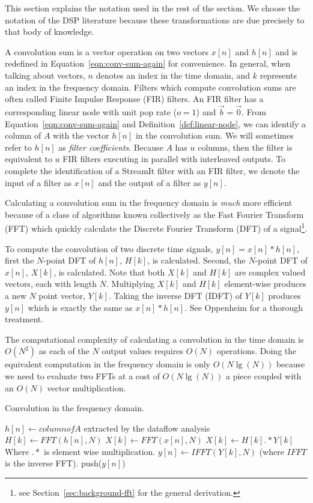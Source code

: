 This section explains the notation used in the rest of the section. 
We choose the notation of the DSP literature because
these transformations are due precisely to that body of knowledge.

A convolution sum is a vector operation on two vectors $x[n]$ and 
$h[n]$ and is redefined in Equation~\ref{eqn:conv-sum-again} for
convenience. In general, when talking about vectors, $n$ denotes 
an index in the time domain, and $k$ represents an index in the 
frequency domain. Filters which compute convolution sums are often called 
Finite Impulse Response (FIR) filters. An FIR filter has a corresponding linear 
node with unit pop rate ($o=1$) and ${\vec b} = {\vec 0}$. From 
Equation~\ref{eqn:conv-sum-again} and Definition~\ref{def:linear-node},
we can identify a column of $A$ with the vector $h[n]$
in the convolution sum. We will sometimes refer to $h[n]$ as 
{\it filter coefficients}. Because $A$ has $u$ columns,	
then the filter is equivalent to $u$ FIR filters 
executing in parallel with interleaved outputs.
To complete the identification of a StreamIt filter with an FIR filter,
we denote the input of a filter as $x[n]$ and the output of
a filter as $y[n]$.

Calculating a convolution sum in the frequency domain is {\it much}
more efficient because of a class of algorithms known collectively as 
the Fast Fourier Transform (FFT) which quickly calculate 
the Discrete Fourier Transform (DFT) of a signal\footnote{see 
Section~\ref{sec:background-fft} for the general derivation.}. 

To compute the convolution of two discrete time signals, $y[n]=x[n]*h[n]$,
first the $N$-point DFT of $h[n]$, $H[k]$, is calculated.
Second, the $N$-point DFT of $x[n]$, $X[k]$, is calculated.
Note that both $X[k]$ and $H[k]$ are complex valued vectors, each with 
length $N$. Multiplying $X[k]$ and $H[k]$ element-wise produces a new $N$ point
vector, $Y[k]$. Taking the inverse DFT (IDFT) of $Y[k]$ produces 
$y[n]$ which is exactly the same as $x[n]*h[n]$. See Oppenheim
\cite{oppenheim-discrete} for a thorough treatment.

The computational complexity of calculating a convolution in the time domain
is $O(N^2)$ as each of the $N$ output values requires $O(N)$ operations.
Doing the equivalent computation in the frequency domain 
is only $O(N \lg(N))$ because we need to evaluate two FFTs at a cost of
$O(N \lg(N))$ a piece coupled with an $O(N)$ vector multiplication.

\begin{algorithm}
  \caption{Convolution in the frequency domain.\label{alg:freq-overview}}
  \begin{algorithmic}
    \STATE $h[n] \leftarrow {\mathit column of}A$ extracted by the dataflow analysis
    \STATE $H[k] \leftarrow FFT(h[n],N)$ 
      \STATE $X[k] \leftarrow FFT(x[n],N)$
      \STATE $X[k] \leftarrow H[k] .* Y[k]$ Where $.*$ is element wise multiplication.
      \STATE $y[n] \leftarrow IFFT(Y[k],N)$ (where $IFFT$ is the inverse FFT).
      \STATE push($y[n]$)
    \ENDWHILE
  \end{algorithmic}
\end{algorithm}

